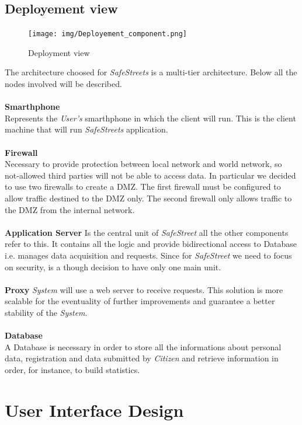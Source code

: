 \documentclass{article}
\begin{document}
\subsection{Deployement view}
\begin{figure}[H]
    \centering
    \texttt{[image: img/Deployement\_component.png]}
    \caption{Deployment view}
\end{figure}  
The architecture choosed for \textit{SafeStreets} is a multi-tier architecture. Below all the nodes 
involved will be described.
\\
\\
\textbf{Smarthphone}\\
Represents the \textit{User's} smarthphone in which the client will run. This is the client machine
that will run \textit{SafeStreets} application.
\\
\\
\textbf{Firewall}\\
Necessary to provide protection between local network and world network, so not-allowed third parties will not be 
able to access data. In particular we decided to use two firewalls to create a DMZ. The first firewall must be configured 
to allow traffic destined to the DMZ only. The second firewall only allows traffic to the DMZ from the internal network.
\\
\\
\textbf{Application Server}
Is the central unit of \textit{SafeStreet} all the other components refer to this. It contains all
the logic and provide bidirectional access to Database i.e. manages data acquisition and requests.
Since for \textit{SafeStreet} we need to focus on security, is a though decision to have only one main
unit.
\\
\\
\textbf{Proxy}
\textit{System} will use a web server to receive requests. This solution is more scalable for the eventuality
of further improvements and guarantee a better stability of the \textit{System}.  
\\
\\
\textbf{Database}\\
A Database is necessary in order to store all the informations about personal data, registration and 
data submitted by \textit{Citizen} and retrieve information in order, for instance, to build statistics.

\section{User Interface Design} 
\end{document}
